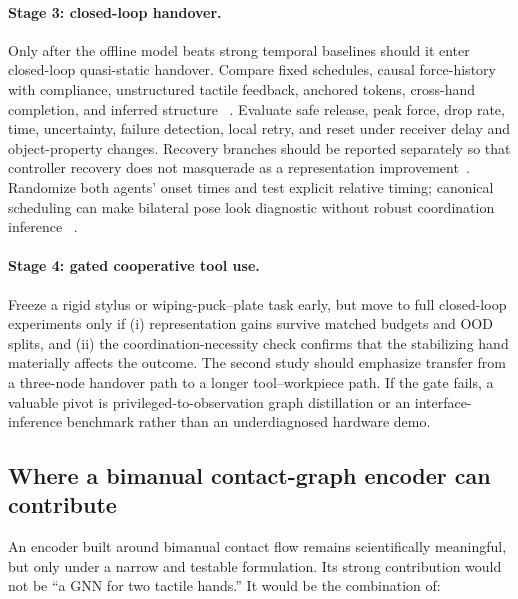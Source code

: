 \paragraph{Stage 3: closed-loop handover.}
Only after the offline model beats strong temporal baselines should it enter
closed-loop quasi-static handover. Compare fixed schedules, causal force-history with compliance, unstructured
tactile feedback, anchored tokens, cross-hand completion, and inferred structure
~\cite{marra2026temporaltactilehandover,liang2026biviewtouch}. Evaluate safe release, peak
force, drop rate, time, uncertainty, failure detection, local retry, and reset
under receiver delay and object-property changes. Recovery branches should be
reported separately so that controller recovery does not masquerade as a
representation improvement~\cite{zhao2026flare}. Randomize both agents' onset
times and test explicit relative timing; canonical scheduling can make bilateral
pose look diagnostic without robust coordination inference
~\cite{update2026whichhand}.

\paragraph{Stage 4: gated cooperative tool use.}
Freeze a rigid stylus or wiping-puck--plate task early, but move to full closed-loop
experiments only if (i) representation gains survive matched budgets and OOD
splits, and (ii) the coordination-necessity check confirms that the stabilizing
hand materially affects the outcome. The second study should emphasize transfer
from a three-node handover path to a longer tool--workpiece path. If the gate
fails, a valuable pivot is privileged-to-observation graph distillation or an
interface-inference benchmark rather than an underdiagnosed hardware demo.

\subsection{Where a bimanual contact-graph encoder can contribute}

An encoder built around bimanual contact flow remains scientifically meaningful,
but only under a narrow and testable formulation. Its strong contribution would
not be ``a GNN for two tactile hands.'' It would be the combination of:

